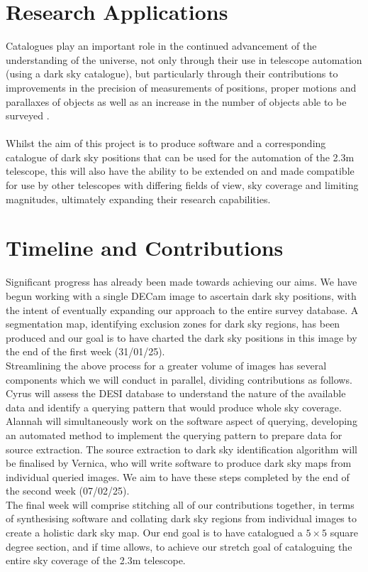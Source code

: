 \documentclass[11pt]{article}
\begin{document}
\section{Research Applications}
Catalogues play an important role in the continued advancement of the understanding of the universe, not only through their use in telescope automation (using a dark sky catalogue), but particularly through their contributions to improvements in the precision of measurements of positions, proper motions and parallaxes of objects as well as an increase in the number of objects able to be surveyed \cite{kopeikin_science_2021}.  \\
\\
Whilst the aim of this project is to produce software and a corresponding catalogue of dark sky positions that can be used for the automation of the 2.3m telescope, this will also have the ability to be extended on and made compatible for use by other telescopes with differing fields of view, sky coverage and limiting magnitudes, ultimately expanding their research capabilities.

\section{Timeline and Contributions}
Significant progress has already been made towards achieving our aims. We have begun working with a single DECam image to ascertain dark sky positions, with the intent of eventually expanding our approach to the entire survey database. A segmentation map, identifying exclusion zones for dark sky regions, has been produced and our goal is to have charted the dark sky positions in this image by the end of the first week (31/01/25). \\

Streamlining the above process for a greater volume of images has several components which we will conduct in parallel, dividing contributions as follows. Cyrus will assess the DESI database to understand the nature of the available data and identify a querying pattern that would produce whole sky coverage. Alannah will simultaneously work on the software aspect of querying, developing an automated method to implement the querying pattern to prepare data for source extraction. The source extraction to dark sky identification algorithm will be finalised by Vernica, who will write software to produce dark sky maps from individual queried images. We aim to have these steps completed by the end of the second week (07/02/25). \\

The final week will comprise stitching all of our contributions together, in terms of synthesising software and collating dark sky regions from individual images to create a holistic dark sky map. Our end goal is to have catalogued a $5\times5$ square degree section, and if time allows, to achieve our stretch goal of cataloguing the entire sky coverage of the 2.3m telescope.

\printbibliography
\end{document}

